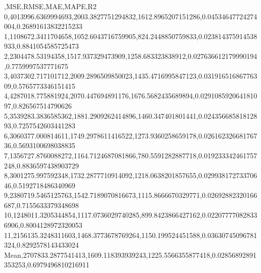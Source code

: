 ,MSE,RMSE,MAE,MAPE,R2
0,4013996.6369994693,2003.3827751294832,1612.8965207151286,0.04534647724274004,0.26891613832215233
1,1108672.3411704658,1052.6043716759905,824.2448850759833,0.023814375914538933,0.8841054585725473
2,2304478.53194358,1517.937329473909,1258.683323838912,0.027636612179990194,0.7759997537771675
3,4037302.717101712,2009.2896509850023,1435.4716995847123,0.03191651686776309,0.5765773346151415
4,4287018.775881924,2070.447694891176,1676.5682435689894,0.029108592064181097,0.826567514790626
5,3539283.3836585362,1881.2909262414896,1460.347401801441,0.02435668581812893,0.7257542603441283
6,3060377.000814611,1749.2978611416522,1273.9360258659178,0.02616232668176736,0.5693100698038835
7,1356727.8760088272,1164.7124687081866,780.5591282887718,0.019233342461757248,0.8836597438903729
8,3001275.997592348,1732.2877710914092,1218.0638201857655,0.02993817273370646,0.5192718486340969
9,2380719.5465125763,1542.7189070816673,1115.8666670329771,0.02692882320166687,0.7155633379348698
10,1248011.3205344854,1117.0736029740285,899.8423866427162,0.022077770828336906,0.8004128972320053
11,2156135.3248311603,1468.3773678769264,1150.199524451588,0.03630745096781324,0.8292578143433024
Mean,2707833.2877541413,1609.118393939243,1225.5566355877418,0.02856892891353253,0.6979496810216911

